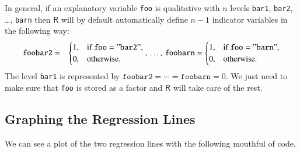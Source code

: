 \documentclass[captions=tableheading]{scrbook}
\begin{document}
\begin{rem}
In general, if an explanatory variable \texttt{foo} is qualitative with \(n\) levels \texttt{bar1}, \texttt{bar2}, \ldots{}, \texttt{barn} then \(\mathsf{R}\) will by default automatically define \(n-1\) indicator variables in the following way:
\begin{eqnarray*}
\mathtt{foobar2} & = & \begin{cases}
1, & \mbox{if }\mathtt{foo}=\mathtt{"bar2"},\\
0, & \mbox{otherwise.}\end{cases},\,\ldots,\,\mathtt{foobarn}=\begin{cases}
1, & \mbox{if }\mathtt{foo}=\mathtt{"barn"},\\
0, & \mbox{otherwise.}\end{cases}
\end{eqnarray*}
The level \texttt{bar1} is represented by \(\mathtt{foobar2}=\cdots=\mathtt{foobarn}=0\). We just need to make sure that \texttt{foo} is stored as a factor and \(\mathsf{R}\) will take care of the rest. 
\end{rem}
\subsection{Graphing the Regression Lines}
\label{sec-12-6-2}


We can see a plot of the two regression lines with the following mouthful of code.
\end{document}
